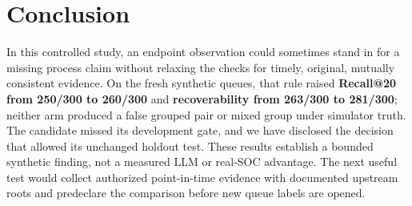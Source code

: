 \section{Conclusion}
In this controlled study, an endpoint observation could sometimes stand in for a missing process claim without relaxing the checks for timely, original, mutually consistent evidence. On the fresh synthetic queues, that rule raised \textbf{Recall@20 from 250/300 to 260/300} and \textbf{recoverability from 263/300 to 281/300}; neither arm produced a false grouped pair or mixed group under simulator truth. The candidate missed its development gate, and we have disclosed the decision that allowed its unchanged holdout test. These results establish a bounded synthetic finding, not a measured LLM or real-SOC advantage. The next useful test would collect authorized point-in-time evidence with documented upstream roots and predeclare the comparison before new queue labels are opened.
